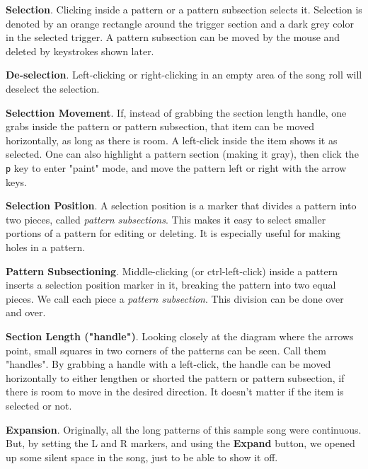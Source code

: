    \begin{enumber}
      \item \textbf{Selection}.
         Clicking inside a pattern or a pattern subsection selects it.
         Selection is denoted by an orange rectangle around the trigger
         section and a dark grey color in the selected trigger.
         A pattern subsection can be moved by the mouse and deleted by keystrokes
         shown later.
      \item \textbf{De-selection}.
         Left-clicking or right-clicking in an empty area of the song roll
         will deselect the selection.
      \item \textbf{Selecttion Movement}.
         If, instead of grabbing the section length handle, one grabs inside
         the pattern or pattern subsection, that item can be moved
         horizontally, as long as there is room.  A left-click
         inside the item shows it as selected.
         One can also highlight a pattern section (making it gray),
         then click the \texttt{p} key to enter "paint" mode, and move the
         pattern left or right with the arrow keys.
      \item \textbf{Selection Position}.
         A selection position is a marker that divides a pattern into two
         pieces, called \textsl{pattern subsections}.  This makes it easy to
         select smaller portions of a pattern for editing or deleting.  It
         is especially useful for making holes in a pattern.
      \item \textbf{Pattern Subsectioning}.
         Middle-clicking (or ctrl-left-click)
         inside a pattern inserts a selection position
         marker in it, breaking the pattern into two equal pieces.
         We call each piece a \textsl{pattern subsection}.
         This division can be done over and over.
      \item \textbf{Section Length ("handle")}.
         Looking closely at the diagram where the arrows point, small
         squares in two corners of the patterns can be seen.
         Call them "handles".
         By grabbing
         a handle with a left-click, the handle can be moved horizontally
         to either lengthen or shorted the pattern or pattern subsection, if
         there is room to move in the desired direction.
         It doesn't matter if the item is selected or not.
      \item \textbf{Expansion}.
         Originally, all the long patterns of this sample song were continuous.
         But, by setting the L and R markers, and using the \textbf{Expand}
         button, we opened up some silent space in the song, just to be able
         to show it off.
   \end{enumber}

